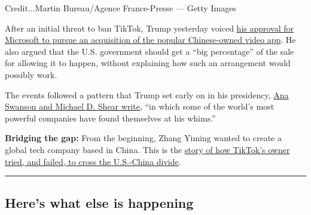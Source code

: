 Credit...Martin Bureau/Agence France-Presse --- Getty Images

After an initial threat to ban TikTok, Trump yesterday voiced
\href{https://www.nytimes.com/2020/08/03/technology/trump-tiktok-microsoft.html}{his
approval for Microsoft to pursue an acquisition of the popular
Chinese-owned video app}. He also argued that the U.S. government should
get a ``big percentage'' of the sale for allowing it to happen, without
explaining how such an arrangement would possibly work.

The events followed a pattern that Trump set early on in his presidency,
\href{https://www.nytimes.com/2020/08/03/business/economy/trump-tiktok-china-business.html}{Ana
Swanson and Michael D. Shear write}, ``in which some of the world's most
powerful companies have found themselves at his whims.''

\textbf{Bridging the gap:} From the beginning, Zhang Yiming wanted to
create a global tech company based in China. This is the
\href{https://www.nytimes.com/2020/08/03/technology/tiktok-bytedance-us-china.html}{story
of how TikTok's owner tried, and failed, to cross the U.S.-China
divide}.

\begin{center}\rule{0.5\linewidth}{\linethickness}\end{center}

\hypertarget{heres-what-else-is-happening}{%
\subsection{Here's what else is
happening}\label{heres-what-else-is-happening}}

